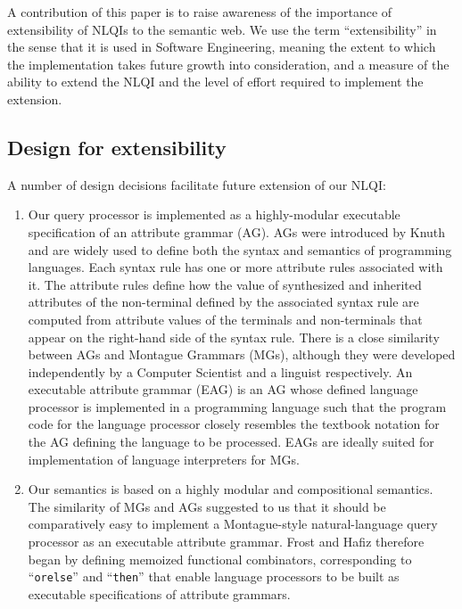 \documentclass[../main.tex]{subfiles}
\begin{document}
\begin{refsection}
A contribution of this paper is to raise awareness of the importance of extensibility of NLQIs to
the semantic web. We use the term ``extensibility'' in the sense that it is used in Software Engineering,
meaning the extent to which the implementation takes future growth into consideration, and a
measure of the ability to extend the NLQI and the level of effort required to implement the extension.


\subsection{Design for extensibility}

A number of design decisions facilitate future extension of our NLQI:

\begin{enumerate}
	\item Our query processor is implemented as a highly-modular executable specification of an attribute grammar (AG). AGs were introduced by Knuth \cite{knuth1968semantics} and are
	widely used to define both the syntax and semantics of programming languages. Each syntax
	rule has one or more attribute rules associated with it. The attribute rules define how the value
	of synthesized and inherited attributes of the non-terminal defined by the
	associated syntax rule are computed from attribute values of the terminals and non-terminals
	that appear on the right-hand side of the syntax rule. There is a close similarity between AGs
	and Montague Grammars (MGs), although they were developed independently by a Computer
	Scientist and a linguist respectively. An executable attribute grammar (EAG) is an AG whose
	defined language processor is implemented in a programming language such that the program
	code for the language processor closely resembles the textbook notation for the AG defining
	the language to be processed. EAGs are ideally suited for
	implementation of language interpreters for MGs.

	\item Our semantics is based on a highly modular and compositional semantics. The similarity of MGs and AGs suggested to us that it should
	be comparatively easy to implement a Montague-style natural-language query processor as an
	executable attribute grammar.  Frost and Hafiz \cite{frosthafiz2008} therefore began by defining memoized functional combinators, corresponding to ``\texttt{orelse}'' and ``\texttt{then}'' that enable language processors to be built as executable specifications of attribute grammars.


\end{enumerate}
\end{refsection}
\end{document}
